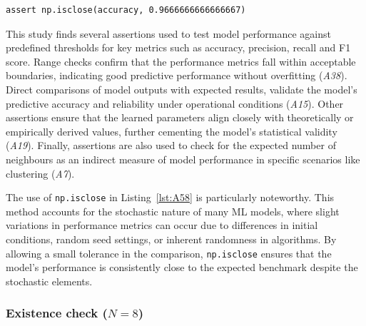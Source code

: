 \begin{lstlisting}[caption={Assertion \emph{A58} used to check that the accuracy of a model is close to the specified value. The use of \lstinline{np.isclose} allows for small deviations in the accuracy thus accounting for the stocastic nature of ML models.}, label={lst:A58}]
assert np.isclose(accuracy, 0.9666666666666667)
\end{lstlisting}

This study finds several assertions used to test model performance against predefined thresholds for key metrics such as accuracy, precision, recall and F1 score. Range checks confirm that the performance metrics fall within acceptable boundaries, indicating good predictive performance without overfitting (\emph{A38}). Direct comparisons of model outputs with expected results, validate the model's predictive accuracy and reliability under operational conditions (\emph{A15}). Other assertions ensure that the learned parameters align closely with theoretically or empirically derived values, further cementing the model’s statistical validity (\emph{A19}). Finally, assertions are also used to check for the expected number of neighbours as an indirect measure of model performance in specific scenarios like clustering (\emph{A7}).

The use of \lstinline{np.isclose} in Listing~\ref{lst:A58} is particularly noteworthy. This method accounts for the stochastic nature of many ML models, where slight variations in performance metrics can occur due to differences in initial conditions, random seed settings, or inherent randomness in algorithms. By allowing a small tolerance in the comparison, \lstinline{np.isclose} ensures that the model's performance is consistently close to the expected benchmark despite the stochastic elements.


\subsubsection{Existence check ($N = 8$)}

